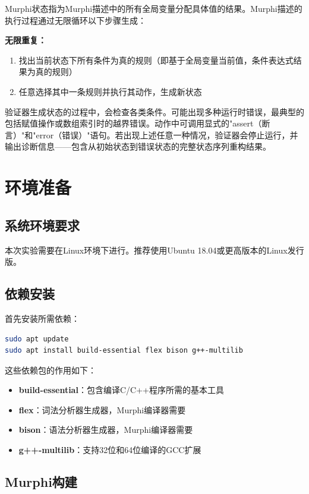 \documentclass[a4paper]{article}
\begin{document}
Murphi状态指为Murphi描述中的所有全局变量分配具体值的结果。Murphi描述的执行过程通过无限循环以下步骤生成：

\textbf{无限重复：}
\begin{enumerate}
    \item 找出当前状态下所有条件为真的规则（即基于全局变量当前值，条件表达式结果为真的规则）
    \item 任意选择其中一条规则并执行其动作，生成新状态
\end{enumerate}

验证器生成状态的过程中，会检查各类条件。可能出现多种运行时错误，最典型的包括赋值操作或数组索引时的越界错误。动作中可调用显式的"assert（断言）"和"error（错误）"语句。若出现上述任意一种情况，验证器会停止运行，并输出诊断信息——包含从初始状态到错误状态的完整状态序列重构结果。

\section{环境准备}

\subsection{系统环境要求}

本次实验需要在Linux环境下进行。推荐使用Ubuntu 18.04或更高版本的Linux发行版。

\subsection{依赖安装}

首先安装所需依赖：
\begin{lstlisting}[language=bash]
sudo apt update
sudo apt install build-essential flex bison g++-multilib
\end{lstlisting}

这些依赖包的作用如下：
\begin{itemize}
    \item \textbf{build-essential}：包含编译C/C++程序所需的基本工具
    \item \textbf{flex}：词法分析器生成器，Murphi编译器需要
    \item \textbf{bison}：语法分析器生成器，Murphi编译器需要
    \item \textbf{g++-multilib}：支持32位和64位编译的GCC扩展
\end{itemize}

\subsection{Murphi构建}
\end{document}

